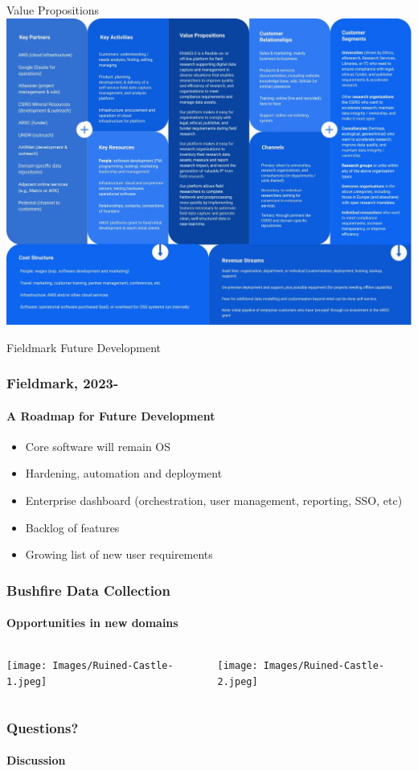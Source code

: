 \begin{frame}{Value Propositions}
\centering
\includegraphics[height=.85\textheight]{Images/01-FAIMS3-business-canvas.jpg}
\end{frame}

\begin{frame}{Fieldmark Future Development}
\frametitle{Fieldmark, 2023-}
\framesubtitle{A Roadmap for Future Development}
    

\begin{itemize}
   \item Core software will remain OS
   \item Hardening, automation and deployment
   \item Enterprise dashboard (orchestration, user management, reporting, SSO, etc) 
   \item Backlog of features 
   \item Growing list of new user requirements
\end{itemize}

\end{frame}


\begin{frame} %
	\frametitle{Bushfire Data Collection}
	\framesubtitle{Opportunities in new domains}


\centering
\begin{columns}[T]
    \begin{column}{.49\textwidth}
        \texttt{[image: Images/Ruined-Castle-1.jpeg]}
    \end{column}
    \begin{column}{.49\textwidth}
        \texttt{[image: Images/Ruined-Castle-2.jpeg]}
    \end{column}
    
\end{columns}



\end{frame}

\begin{sectionframe}
    \frametitle{Questions?}
    \framesubtitle{Discussion}
\end{sectionframe}



